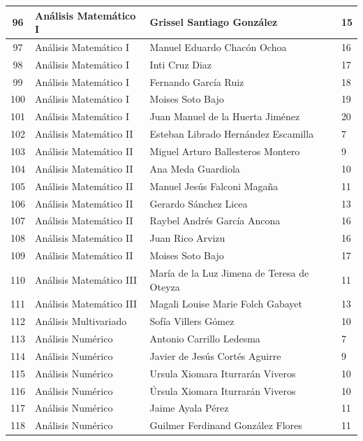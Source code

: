{\begin{longtable}{|c|p{6.5cm}|p{5cm}|p{1.5cm}|}
  96 & Análisis Matemático I & Grissel Santiago González & 15 \\ \hline 
  97 & Análisis Matemático I & Manuel Eduardo Chacón Ochoa & 16 \\ \hline 
  98 & Análisis Matemático I & Inti Cruz Diaz & 17 \\ \hline 
  99 & Análisis Matemático I & Fernando García Ruiz & 18 \\ \hline 
  100 & Análisis Matemático I & Moises Soto Bajo & 19 \\ \hline 
  101 & Análisis Matemático I & Juan Manuel de la Huerta Jiménez & 20 \\ \hline 
  102 & Análisis Matemático II & Esteban Librado Hernández Escamilla & 7 \\ \hline 
  103 & Análisis Matemático II & Miguel Arturo Ballesteros Montero & 9 \\ \hline 
  104 & Análisis Matemático II & Ana Meda Guardiola & 10 \\ \hline 
  105 & Análisis Matemático II & Manuel Jesús Falconi Magaña & 11 \\ \hline 
  106 & Análisis Matemático II & Gerardo Sánchez Licea & 13 \\ \hline 
  107 & Análisis Matemático II & Raybel Andrés García Ancona & 16 \\ \hline 
  108 & Análisis Matemático II & Juan Rico Arvizu & 16 \\ \hline 
  109 & Análisis Matemático II & Moises Soto Bajo & 17 \\ \hline 
  110 & Análisis Matemático III & María de la Luz Jimena de Teresa de Oteyza & 11 \\ \hline 
  111 & Análisis Matemático III & Magali Louise Marie Folch Gabayet & 13 \\ \hline 
  112 & Análisis Multivariado & Sofía Villers Gómez & 10 \\ \hline 
  113 & Análisis Numérico & Antonio Carrillo Ledesma & 7 \\ \hline 
  114 & Análisis Numérico & Javier de Jesús Cortés Aguirre & 9 \\ \hline 
  115 & Análisis Numérico & Ursula Xiomara Iturrarán Viveros & 10 \\ \hline 
  116 & Análisis Numérico & Úrsula Xiomara Iturrarán Viveros & 10 \\ \hline 
  117 & Análisis Numérico & Jaime Ayala Pérez & 11 \\ \hline 
  118 & Análisis Numérico & Guilmer Ferdinand González Flores & 11 \\ \hline 

\end{longtable}}
